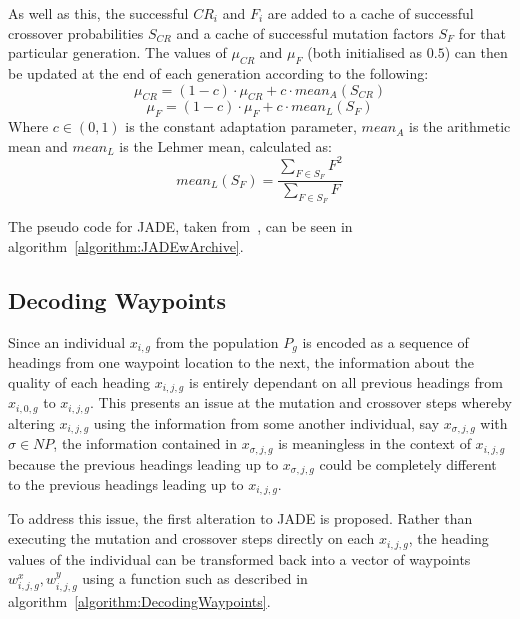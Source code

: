 \documentclass[10pt,a4paper, oneside, conference]{IEEEtran}
\begin{document}
	As well as this, the successful $CR_i$ and $F_i$ are added to a cache of successful crossover probabilities $S_{CR}$ and a cache of successful mutation factors $S_F$ for that particular generation. The values of $\mu_{CR}$ and $\mu_F$ (both initialised as $0.5$) can then be updated at the end of each generation according to the following:
	\begin{equation}
	\label{equation:JADEAdaptionCR}
	\mu_{CR}=(1-c) \cdot \mu_{CR} + c \cdot mean_A(S_{CR})
	\end{equation}
	\begin{equation}
	\label{equation:JADEAdaptionF}
	\mu_F=(1-c) \cdot \mu_F + c \cdot mean_L(S_F)
	\end{equation}
	Where $c\in (0,1)$ is the constant adaptation parameter, $mean_A$ is the arithmetic mean and $mean_L$ is the Lehmer mean, calculated as:
	\begin{equation}
	\label{equation:LehmerMean}
	mean_L(S_F)=\frac{\sum_{F\in S_F}{F^2}}{\sum_{F\in S_F}{F}}
	\end{equation}
	
	The pseudo code for JADE, taken from~\cite{Zhang2009}, can be seen in algorithm~\ref{algorithm:JADEwArchive}.
	
	\subsection{Decoding Waypoints}
	
	Since an individual $x_{i,g}$ from the population $P_g$ is encoded as a sequence of headings from one waypoint location to the next, the information about the quality of each heading $x_{i,j,g}$ is entirely dependant on all previous headings from $x_{i,0,g}$ to $x_{i,j,g}$.
	This presents an issue at the mutation and crossover steps whereby altering $x_{i,j,g}$ using the information from some another individual, say $x_{\sigma,j,g}$ with $\sigma \in NP$, the information contained in $x_{\sigma,j,g}$ is meaningless in the context of $x_{i,j,g}$ because the previous headings leading up to $x_{\sigma,j,g}$ could be completely different to the previous headings leading up to $x_{i,j,g}$.
	
	To address this issue, the first alteration to JADE is proposed.
	Rather than executing the mutation and crossover steps directly on each $x_{i,j,g}$, the heading values of the individual can be transformed back into a vector of waypoints $w^x_{i,j,g},w^y_{i,j,g}$ using a function such as described in algorithm~\ref{algorithm:DecodingWaypoints}.
	
\end{document}
